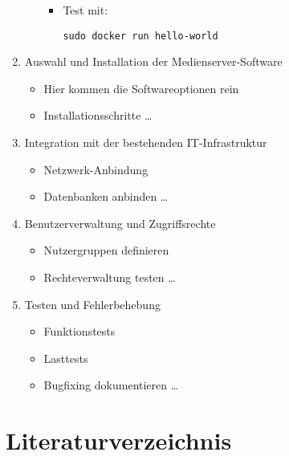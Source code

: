 \documentclass[12pt,a4paper]{report}
\begin{document}
\begin{enumerate}
\begin{itemize}
\begin{itemize}
          \item Test mit:
          \begin{verbatim}
sudo docker run hello-world
          \end{verbatim}
        \end{itemize}
    \end{itemize}

  \item Auswahl und Installation der Medienserver-Software
    \begin{itemize}
      \item Hier kommen die Softwareoptionen rein
      \item Installationsschritte …
    \end{itemize}

  \item Integration mit der bestehenden IT-Infrastruktur
    \begin{itemize}
      \item Netzwerk-Anbindung
      \item Datenbanken anbinden …
    \end{itemize}

  \item Benutzerverwaltung und Zugriffsrechte
    \begin{itemize}
      \item Nutzergruppen definieren
      \item Rechteverwaltung testen …
    \end{itemize}

  \item Testen und Fehlerbehebung
    \begin{itemize}
      \item Funktionstests
      \item Lasttests
      \item Bugfixing dokumentieren …
    \end{itemize}
\end{enumerate}
\newpage

\chapter*{Literaturverzeichnis}
\printbibliography[heading=none]
\end{document}
